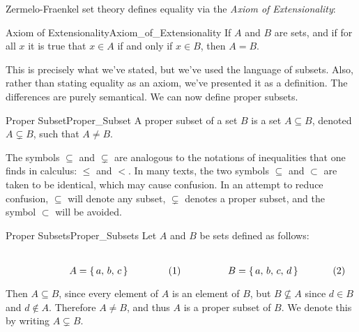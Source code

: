         Zermelo-Fraenkel set theory defines equality via
        the \textit{Axiom of Extensionality}:
        \begin{faxiom}{Axiom of Extensionality}{Axiom_of_Extensionality}
            If $A$ and $B$ are sets, and if for all $x$ it is true that
            $x\in{A}$ if and only if $x\in{B}$, then $A=B$.
        \end{faxiom}
        This is precisely what we've stated, but we've used the language of
        subsets. Also, rather than stating equality as an axiom, we've
        presented it as a definition. The differences are purely semantical.
        We can now define proper subsets.
        \begin{ldefinition}{Proper Subset}{Proper_Subset}
            A \gls{proper subset} of a set $B$ is a set $A\subseteq{B}$,
            denoted $A\subsetneq{B}$, such that $A\ne{B}$.
        \end{ldefinition}
        The symbols $\subseteq$ and $\subsetneq$ are analogous to the
        notations of inequalities that one finds in calculus: $\leq$ and $<$.
        In many texts, the two symbols $\subseteq$ and $\subset$ are taken to
        be identical, which may cause confusion. In an attempt to reduce
        confusion, $\subseteq$ will denote any subset, $\subsetneq$ denotes a
        proper subset, and the symbol $\subset$ will be avoided.
        \begin{lexample}{Proper Subsets}{Proper_Subsets}
            Let $A$ and $B$ be sets defined as follows:
            \par
            \begin{subequations}
                \begin{minipage}[b]{0.49\textwidth}
                    \centering
                    \begin{equation}
                        A=\{\,a,\,b,\,c\,\}
                    \end{equation}
                \end{minipage}
                \hfill
                \begin{minipage}[b]{0.49\textwidth}
                    \centering
                    \begin{equation}
                        B=\{\,a,\,b,\,c,\,d\,\}
                    \end{equation}
                \end{minipage}
            \end{subequations}
            \par\vspace{2.5ex}
            Then $A\subseteq{B}$, since every element of $A$ is an element of
            $B$, but $B\nsubseteq{A}$ since $d\in{B}$ and $d\notin{A}$.
            Therefore $A\ne{B}$, and thus $A$ is a  proper subset of $B$.
            We denote this by writing $A\subsetneq{B}$.
        \end{lexample}
